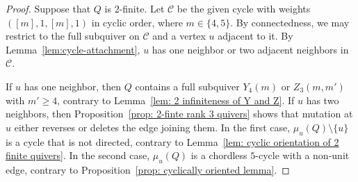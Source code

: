 \documentclass[11pt,reqno]{amsart}
\numberwithin{equation}{section}
\theoremstyle{definition}
\theoremstyle{plain}
\newcommand{\bra}[1]{\left[#1\right]}
\begin{document}
	\begin{proof}
		Suppose that $Q$ is $2$-finite. Let $\mathcal C$ be the given cycle with weights $(\bra{m},1,\bra{m},1)$ in cyclic order, where $m\in\{4,5\}$. By connectedness, we may restrict to the full subquiver on $\mathcal C$ and a vertex $u$ adjacent to it. By Lemma~\ref{lem:cycle-attachment}, $u$ has one neighbor or two adjacent neighbors in $\mathcal C$.
		
		If $u$ has one neighbor, then $Q$ contains a full subquiver $Y_4(m)$ or $Z_3(m,m')$ with $m'\geq4$, contrary to Lemma~\ref{lem: 2 infiniteness of Y and Z}. If $u$ has two neighbors, then Proposition~\ref{prop: 2-finte rank 3 quivers} shows that mutation at $u$ either reverses or deletes the edge joining them. In the first case, $\mu_u(Q)\setminus\{u\}$ is a cycle that is not directed, contrary to Lemma~\ref{lem: cyclic orientation of 2 finite quivers}. In the second case, $\mu_u(Q)$ is a chordless $5$-cycle with a non-unit edge, contrary to Proposition~\ref{prop: cyclically oriented lemma}.
	\end{proof}
\end{document}
